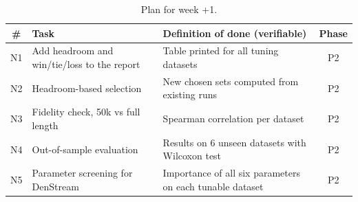 \begin{table}[H]
\centering
\caption{Plan for week \number\numexpr\WeekNo+1\relax.}
\label{tab:next}
\small
\begin{tabularx}{\textwidth}{@{}c L L c@{}}
\toprule
\textbf{\#} & \textbf{Task} & \textbf{Definition of done (verifiable)} & \textbf{Phase} \\
\midrule
N1 & Add headroom and win/tie/loss to the report & Table printed for all tuning datasets & P2 \\
N2 & Headroom-based selection & New chosen sets computed from existing runs & P2 \\
N3 & Fidelity check, 50k vs full length & Spearman correlation per dataset & P2 \\
N4 & Out-of-sample evaluation & Results on 6 unseen datasets with Wilcoxon test & P2 \\
N5 & Parameter screening for DenStream & Importance of all six parameters on each tunable dataset & P2 \\
\bottomrule
\end{tabularx}
\end{table}
